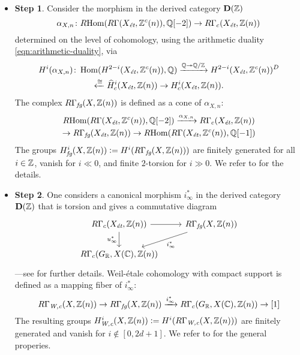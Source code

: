 \documentclass[draft]{article}
\numberwithin{equation}{section}
\begin{document}
\begin{itemize}
\item \textbf{Step 1}. Consider the morphism in the derived category
  $\mathbf{D} (\ZZ)$
  \[ \alpha_{X,n}\colon \RHom (R\Gamma (X_\et, \ZZ^c(n)), \QQ [-2]) \to
    R\Gamma_c (X_\et, \ZZ(n)) \]
  determined on the level of cohomology, using the arithmetic duality
  \eqref{eqn:arithmetic-duality}, via
  \begin{multline}
    \label{eqn:alpha-X-n-cohomology}
    H^i (\alpha_{X,n})\colon \Hom (H^{2-i} (X_\et, \ZZ^c(n)), \QQ)
    \xrightarrow{\QQ \twoheadrightarrow \QQ/\ZZ}
    H^{2-i} (X_\et, \ZZ^c(n))^D \\
    \xleftarrow{\cong} \widehat{H}^i_c (X_\et, \ZZ(n)) \to
    H^i_c (X_\et, \ZZ(n)).
  \end{multline}
  The complex $R\Gamma_\fg (X, \ZZ(n))$ is defined as a cone of
  $\alpha_{X,n}$:
  \begin{multline*}
    \RHom (R\Gamma (X_\et, \ZZ^c(n)), \QQ [-2]) \xrightarrow{\alpha_{X,n}}
    R\Gamma_c (X_\et, \ZZ(n)) \\
    \to R\Gamma_\fg (X_\et, \ZZ(n)) \to \RHom (R\Gamma (X_\et, \ZZ^c(n)), \QQ [-1])
  \end{multline*}
  The groups $H^i_\fg (X, \ZZ(n)) \dfn H^i (R\Gamma_\fg (X, \ZZ(n)))$ are
  finitely generated for all $i \in \ZZ$, vanish for $i \ll 0$, and finite
  $2$-torsion for $i \gg 0$.  We refer to \cite[\S 5]{Beshenov-Weil-etale-1} for
  the details.

\item \textbf{Step 2}. One considers a canonical morphism $i^*_\infty$ in the
  derived category $\mathbf{D} (\ZZ)$ that is torsion and gives a commutative
  diagram
  \[ \begin{tikzcd}
      R\Gamma_c (X_\et, \ZZ(n)) \ar{r}\ar{d}[swap]{u^*_\infty} & R\Gamma_\fg (X, \ZZ(n)) \ar{dl}{i^*_\infty} \\
      R\Gamma_c (G_\RR, X(\CC), \ZZ(n))
    \end{tikzcd} \]
  ---see \cite[\S\S 6,7]{Beshenov-Weil-etale-1} for further details.
  Weil-\'{e}tale cohomology with compact support is defined as a mapping fiber of
  $i^*_\infty$:
  \[ R\Gamma_\Wc (X, \ZZ(n)) \to
    R\Gamma_\fg (X, \ZZ(n)) \xrightarrow{i^*_\infty}
    R\Gamma_c (G_\RR, X(\CC), \ZZ(n)) \to [1] \]
  The resulting groups $H^i_\Wc (X, \ZZ(n)) \dfn H^i (R\Gamma_\Wc (X, \ZZ(n)))$
  are finitely generated and vanish for $i \notin [0,2d+1]$. We refer to
  \cite[\S 7]{Beshenov-Weil-etale-1} for the general properies.
\end{itemize}
\end{document}
